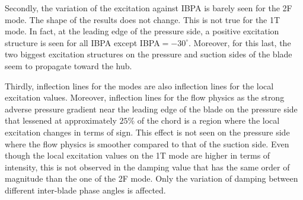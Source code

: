 Secondly, the variation of the excitation against IBPA
is barely seen for the 2F mode. The shape of the
results does not change. This is not true for the
1T mode. In fact, at the leading edge of the pressure side,
a positive excitation structure is seen for all IBPA except
\mbox{IBPA$=-30^\circ$}. Moreover, for this last, 
the two biggest excitation structures on the pressure 
and suction sides of the blade seem to propagate toward the hub.

Thirdly, inflection lines
for the modes are also inflection lines for the local excitation
values. Moreover, inflection lines for the flow physics as the
strong adverse pressure gradient near the leading edge of the blade
on the pressure side that lessened at approximately $25\%$ of the chord
is a region where the local excitation changes in terms of sign.
This effect is not seen on the pressure side where the flow physics
is smoother compared to that of the suction side. Even though the
local excitation values on the 1T mode are higher in terms of
intensity, this is not observed in the damping value that
has the same order of magnitude than the one of the 2F mode.
Only the variation of damping between different inter-blade phase angles
is affected. 

